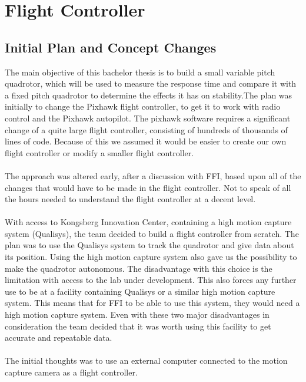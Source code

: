 \section{Flight Controller}

\subsection{Initial Plan and Concept Changes}
The main objective of this bachelor thesis is to build a small variable pitch quadrotor, which will be used to measure the response time and compare it with a fixed pitch quadrotor to determine the effects it has on stability.The plan was initially to change the Pixhawk flight controller, to get it to work with radio control and the Pixhawk autopilot. The pixhawk software requires a significant change of a quite large flight controller, consisting of hundreds of thousands of lines of code. Because of this we assumed it would be easier to create our own flight controller or modify a smaller flight controller. 
\\\\
The approach was altered early, after a discussion with FFI, based upon all of the changes that would have to be made in the flight controller. Not to speak of all the hours needed to understand the flight controller at a decent level. 
\\\\
With access to Kongsberg Innovation Center, containing a high motion capture system (Qualisys), the team decided to build a flight controller from scratch. The plan was to use the Qualisys system to track the quadrotor and give data about its position. Using the high motion capture system also gave us the possibility to make the quadrotor autonomous. The disadvantage with this choice is the limitation with access to the lab under development. This also forces any further use to be at a facility containing Qualisys or a similar high motion capture system. This means that for FFI to be able to use this system, they would need a high motion capture system. Even with these two major disadvantages in consideration the team decided that it was worth using this facility to get accurate and repeatable data.  
\\\\
The initial thoughts was to use an external computer connected to the motion capture camera as a flight controller.\\

